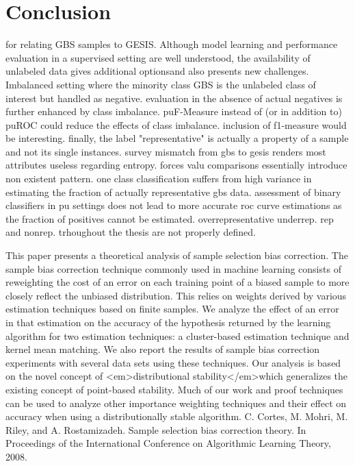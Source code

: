 \chapter{Conclusion}\label{Sec:Conclusion}

for relating GBS samples to GESIS. 
Although model learning and performance evaluation in a supervised setting are well understood, the availability of unlabeled data gives additional optionsand also presents new challenges.
Imbalanced setting where the minority class GBS is the unlabeled class of interest but handled as negative. evaluation in the absence of actual negatives is further enhanced by class imbalance. puF-Measure instead of (or in addition to) puROC could reduce the effects of class imbalance. inclusion of f1-measure would be interesting. finally, the label "representative" is actually a property of a sample and not its single instances. survey mismatch from gbs to gesis renders most attributes useless regarding entropy. forces valu comparisons essentially introduce non existent pattern. one class classification suffers from high variance in estimating the fraction of actually representative gbs data. assessment of binary classifiers in pu settings does not lead to more accurate roc curve estimations as the fraction of positives cannot be estimated. overrepresentative underrep. rep and nonrep. trhoughout the thesis are not properly defined.

This paper presents a theoretical analysis of sample selection bias correction. The sample bias correction technique commonly used in machine learning consists of reweighting the cost of an error on each training point of a biased sample to more closely reflect the unbiased distribution. This relies on weights derived by various estimation techniques based on finite samples. We analyze the effect of an error in that estimation on the accuracy of the hypothesis returned by the learning algorithm for two estimation techniques: a cluster-based estimation technique and kernel mean matching. We also report the results of sample bias correction experiments with several data sets using these techniques. Our analysis is based on the novel concept of <em>distributional stability</em>which generalizes the existing concept of point-based stability. Much of our work and proof techniques can be used to analyze other importance weighting techniques and their effect on accuracy when using a distributionally stable algorithm. C. Cortes, M. Mohri, M. Riley, and A. Rostamizadeh. Sample selection bias correction theory. In Proceedings of the International Conference on Algorithmic Learning Theory, 2008.
